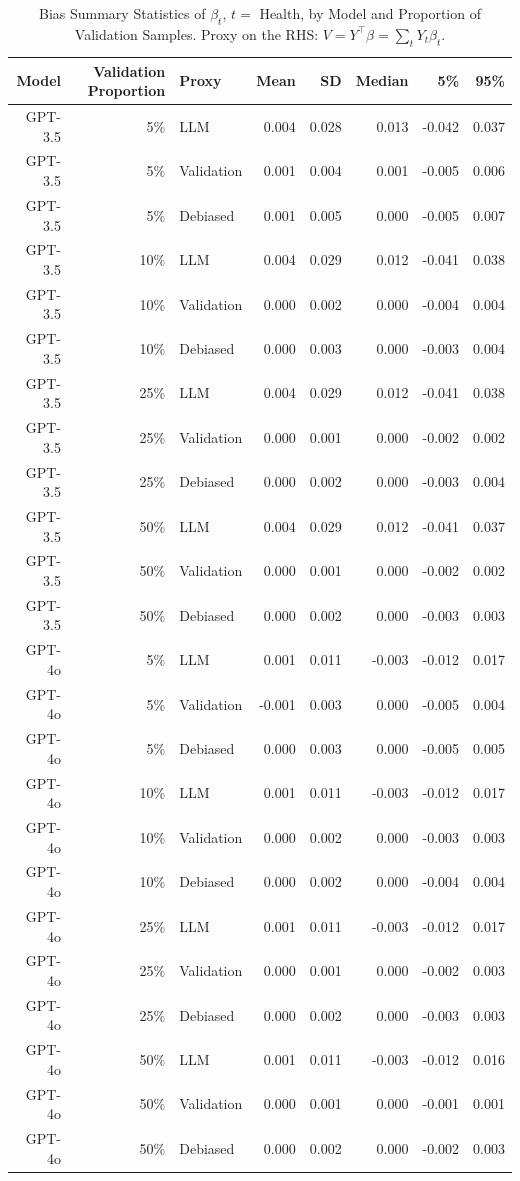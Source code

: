 \begin{table}

\caption{Bias Summary Statistics of $\beta_{t}$, $t=$ Health, by Model and Proportion of Validation Samples. Proxy on the RHS: $V = Y^\top \beta = \sum_{t} Y_t \beta_t$.}
\centering
\begin{tabular}[t]{rrlrrrrr}
\toprule
Model & Validation Proportion & Proxy & Mean & SD & Median & 5\% & 95\%\\
\midrule
GPT-3.5 & 5\% & LLM & 0.004 & 0.028 & 0.013 & -0.042 & 0.037\\
GPT-3.5 & 5\% & Validation & 0.001 & 0.004 & 0.001 & -0.005 & 0.006\\
GPT-3.5 & 5\% & Debiased & 0.001 & 0.005 & 0.000 & -0.005 & 0.007\\
GPT-3.5 & 10\% & LLM & 0.004 & 0.029 & 0.012 & -0.041 & 0.038\\
GPT-3.5 & 10\% & Validation & 0.000 & 0.002 & 0.000 & -0.004 & 0.004\\
GPT-3.5 & 10\% & Debiased & 0.000 & 0.003 & 0.000 & -0.003 & 0.004\\
GPT-3.5 & 25\% & LLM & 0.004 & 0.029 & 0.012 & -0.041 & 0.038\\
GPT-3.5 & 25\% & Validation & 0.000 & 0.001 & 0.000 & -0.002 & 0.002\\
GPT-3.5 & 25\% & Debiased & 0.000 & 0.002 & 0.000 & -0.003 & 0.004\\
GPT-3.5 & 50\% & LLM & 0.004 & 0.029 & 0.012 & -0.041 & 0.037\\
GPT-3.5 & 50\% & Validation & 0.000 & 0.001 & 0.000 & -0.002 & 0.002\\
GPT-3.5 & 50\% & Debiased & 0.000 & 0.002 & 0.000 & -0.003 & 0.003\\
GPT-4o & 5\% & LLM & 0.001 & 0.011 & -0.003 & -0.012 & 0.017\\
GPT-4o & 5\% & Validation & -0.001 & 0.003 & 0.000 & -0.005 & 0.004\\
GPT-4o & 5\% & Debiased & 0.000 & 0.003 & 0.000 & -0.005 & 0.005\\
GPT-4o & 10\% & LLM & 0.001 & 0.011 & -0.003 & -0.012 & 0.017\\
GPT-4o & 10\% & Validation & 0.000 & 0.002 & 0.000 & -0.003 & 0.003\\
GPT-4o & 10\% & Debiased & 0.000 & 0.002 & 0.000 & -0.004 & 0.004\\
GPT-4o & 25\% & LLM & 0.001 & 0.011 & -0.003 & -0.012 & 0.017\\
GPT-4o & 25\% & Validation & 0.000 & 0.001 & 0.000 & -0.002 & 0.003\\
GPT-4o & 25\% & Debiased & 0.000 & 0.002 & 0.000 & -0.003 & 0.003\\
GPT-4o & 50\% & LLM & 0.001 & 0.011 & -0.003 & -0.012 & 0.016\\
GPT-4o & 50\% & Validation & 0.000 & 0.001 & 0.000 & -0.001 & 0.001\\
GPT-4o & 50\% & Debiased & 0.000 & 0.002 & 0.000 & -0.002 & 0.003\\
\bottomrule
\end{tabular}
\end{table}

